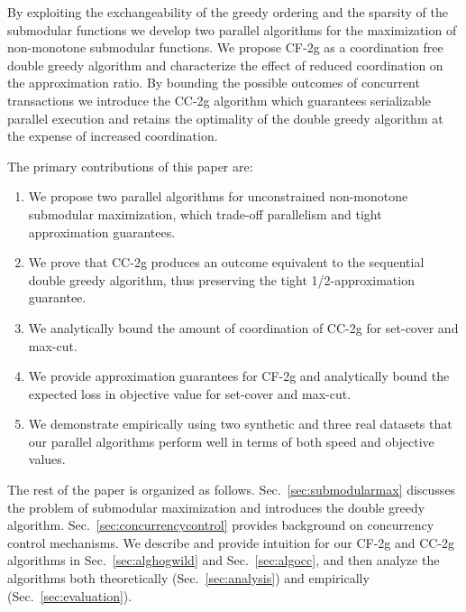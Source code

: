 \documentclass{article} %
\newcommand{\hogwild}{CF-2g}
\newcommand{\occ}{CC-2g}
\newcommand{\secref}[1]{Sec.~\ref{#1}}
\begin{document}
By exploiting the exchangeability of the greedy ordering and the sparsity of  the submodular functions we develop two parallel algorithms for the maximization of non-monotone submodular functions.
We propose \hogwild{} as a coordination free double greedy algorithm and characterize the effect of reduced coordination on the approximation ratio.
By bounding the possible outcomes of concurrent transactions we introduce the \occ{} algorithm which guarantees serializable parallel execution and retains the optimality of the double greedy algorithm at the expense of increased coordination.


The primary contributions of this paper are:
\begin{enumerate}
\item We propose two parallel algorithms for unconstrained non-monotone submodular maximization, which trade-off parallelism and tight approximation guarantees.
\item We prove that \occ{} produces an outcome equivalent to the sequential double greedy algorithm, thus preserving the tight 1/2-approximation guarantee.
\item We analytically bound the amount of coordination of \occ{} for set-cover and max-cut.
\item We provide approximation guarantees for \hogwild{} and analytically bound the expected loss in objective value for set-cover and max-cut.
\item We demonstrate empirically using two synthetic and three real datasets that our parallel algorithms perform well in terms of both speed and objective values.
\end{enumerate}

The rest of the paper is organized as follows.
\secref{sec:submodularmax} discusses the problem of submodular maximization and introduces the double greedy algorithm.
\secref{sec:concurrencycontrol} provides background on concurrency control mechanisms.
We describe and provide intuition for our \hogwild{} and \occ{} algorithms in \secref{sec:alghogwild} and \secref{sec:algocc}, and then analyze the algorithms both theoretically (\secref{sec:analysis}) and empirically (\secref{sec:evaluation}).
\end{document}
